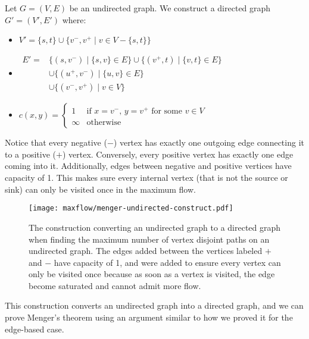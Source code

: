 Let $G=(V,E)$ be an undirected graph. We construct a directed graph $G'=(V',E')$ where:
\begin{itemize}
    \item[] $V' = \{s,t\} \cup \{v^-, v^+ \mid v \in V - \{s,t\}\}$ 
    
    \hfill

    \item[] $\begin{aligned}
        E' = &\{(s,v^-) \mid \{s,v\} \in E\} \cup \{(v^+,t) \mid \{v,t\} \in E\} \\
        &\cup \{(u^+,v^-) \mid \{u,v\} \in E\} \\
        &\cup \{(v^-,v^+) \mid v \in V\}
    \end{aligned}$
    
    \hfill
    
    \item[] $c(x,y) = \begin{cases}
        1 & \text{if $x=v^-$, $y=v^+$ for some $v \in V$ } \\
        \infty & \text{otherwise}
    \end{cases}$ 
\end{itemize}

Notice that every negative ($-$) vertex has exactly one outgoing edge connecting it to a positive ($+$) vertex. Conversely, every positive vertex has exactly one edge coming into it. Additionally, edges between negative and positive vertices have capacity of 1. This makes sure every internal vertex (that is not the source or sink) can only be visited once in the maximum flow.

\begin{figure}[htbp]
    \centering
    \texttt{[image: maxflow/menger-undirected-construct.pdf]}
    \caption{The construction converting an undirected graph to a directed graph when finding the maximum number of vertex disjoint paths on an undirected graph. The edges added between the vertices labeled $+$ and $-$ have capacity of 1, and were added to ensure every vertex can only be visited once because as soon as a vertex is visited, the edge become saturated and cannot admit more flow.}
    \label{fig:menger-undirected-construct}
\end{figure}

This construction converts an undirected graph into a directed graph, and we can prove Menger's theorem using an argument similar to how we proved it for the edge-based case.

